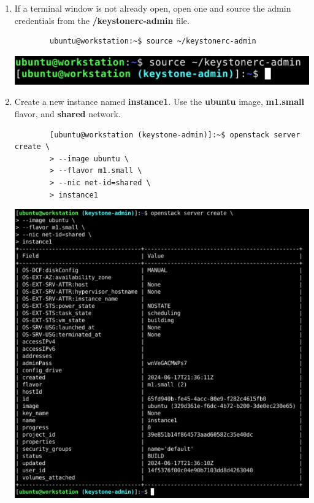 \documentclass[letterpaper, 12pt]{article}
\begin{document}
\begin{enumerate}
    \item If a terminal window is not already open, open one and source the admin credentials from the \textbf{\texttildemid/keystonerc-admin} file.
    \begin{lstlisting}
        ubuntu@workstation:~$ source ~/keystonerc-admin
    \end{lstlisting}

    \begin{center}
        \includegraphics[width=\linewidth]{images/part3/step1.png}
    \end{center}

    \item Create a new instance named \textbf{instance1}.
    Use the \textbf{ubuntu} image, \textbf{m1.small} flavor, and \textbf{shared} network.
    \begin{lstlisting}
        [ubuntu@workstation (keystone-admin)]:~$ openstack server create \
        > --image ubuntu \
        > --flavor m1.small \
        > --nic net-id=shared \
        > instance1
    \end{lstlisting}

    \begin{center}
        \includegraphics[width=\linewidth]{images/part3/step2.png}
    \end{center}


\end{enumerate}
\end{document}
